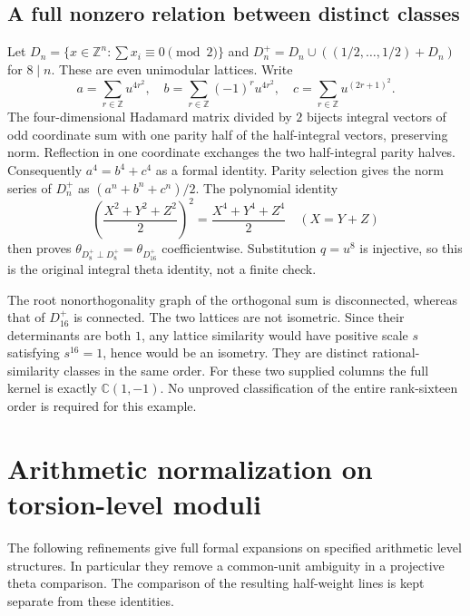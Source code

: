 \documentclass[11pt]{article}
\theoremstyle{remark}\newtheorem{remark}[theorem]{Remark}
\newcommand{\Z}{\mathbb Z}\newcommand{\Q}{\mathbb Q}
\newcommand{\C}{\mathbb C}\newcommand{\OO}{\mathcal O}
\begin{document}
\subsection{A full nonzero relation between distinct classes}
Let $D_n=\{x\in\Z^n:\sum x_i\equiv0\pmod2\}$ and
$D_n^+=D_n\cup((1/2,\ldots,1/2)+D_n)$ for $8\mid n$.
These are even unimodular lattices. Write
\[
 a=\sum_{r\in\Z}u^{4r^2},\quad
 b=\sum_{r\in\Z}(-1)^ru^{4r^2},\quad
 c=\sum_{r\in\Z}u^{(2r+1)^2}.
\]
The four-dimensional Hadamard matrix divided by $2$ bijects integral
vectors of odd coordinate sum with one parity half of the half-integral
vectors, preserving norm. Reflection in one coordinate exchanges the
two half-integral parity halves. Consequently $a^4=b^4+c^4$ as a
formal identity. Parity selection gives the norm series of $D_n^+$ as
$(a^n+b^n+c^n)/2$.
The polynomial identity
\[
 \left(\frac{X^2+Y^2+Z^2}{2}\right)^2
       =\frac{X^4+Y^4+Z^4}{2}\quad(X=Y+Z)
\]
then proves $\theta_{D_8^+\perp D_8^+}=\theta_{D_{16}^+}$ coefficientwise.
Substitution $q=u^8$ is injective, so this is the original integral
theta identity, not a finite check.

The root nonorthogonality graph of the orthogonal sum is disconnected,
whereas that of $D_{16}^+$ is connected. The two lattices are not
isometric. Since their determinants are both $1$, any lattice similarity
would have positive scale $s$ satisfying $s^{16}=1$, hence would be an
isometry. They are distinct rational-similarity classes in the same
order. For these two supplied columns the full kernel is exactly
$\C(1,-1)$. No unproved classification of the entire rank-sixteen order
is required for this example.

\section{Arithmetic normalization on torsion-level moduli}\label{refinement}
The following refinements give full formal expansions on specified
arithmetic level structures. In particular they remove a common-unit
ambiguity in a projective theta comparison. The comparison of the resulting
half-weight lines is kept separate from these identities.
\end{document}
